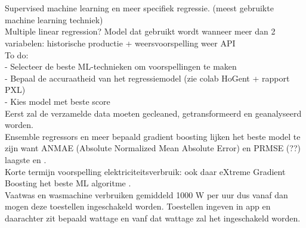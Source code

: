 
\chapter{}%
\label{ch:methodologie}


Supervised machine learning en meer specifiek regressie. (meest gebruikte machine learning techniek) \\

Multiple linear regression? Model dat gebruikt wordt wanneer meer dan 2 variabelen: historische productie + weersvoorspelling weer API \\

To do: \\
- Selecteer de beste ML-technieken om voorspellingen te maken \\
- Bepaal de accuraatheid van het regressiemodel (zie colab HoGent + rapport PXL) \\
- Kies model met beste score \\

Eerst zal de verzamelde data moeten gecleaned, getransformeerd en geanalyseerd worden. \\

Ensemble regressors en meer bepaald gradient boosting lijken het beste model te zijn want ANMAE (Absolute Normalized Mean Absolute Error) en PRMSE (??) laagste \autocite{Khasawneh2024} en \autocite{Tercha2024}. \\

Korte termijn voorspelling elektriciteitsverbruik: ook daar eXtreme Gradient Boosting het beste ML algoritme \autocite{Irankhah2024}. \\

Vaatwas en wasmachine verbruiken gemiddeld 1000 W per uur dus vanaf dan mogen deze toestellen ingeschakeld worden. Toestellen ingeven in app en daarachter zit bepaald wattage en vanf dat wattage zal het ingeschakeld worden.


